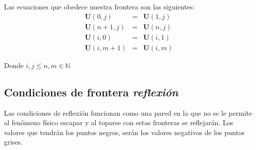 \documentclass[12pt,a4paper]{book}
\begin{document}
Las ecuaciones que obedece nuestra frontera son las siguientes:
\begin{eqnarray}
\textbf{U}(0,j)&=&\textbf{U}(1,j) \\
\textbf{U}(n+1,j)&=&\textbf{U}(n,j) \\
\textbf{U}(i,0)&=&\textbf{U}(i,1) \\
\textbf{U}(i,m+1)&=&\textbf{U}(i,m) 
\end{eqnarray}

Donde $i,j \leq n,m \in \mathbb{N}$

\subsection{Condiciones de frontera \emph{reflexión}}

Las condiciones de reflexión funcionan como una pared en la que no se le permite al fenómeno físico escapar y al toparse con estas fronteras se reflejarán. Los valores que tendrán los puntos negros, serán los valores negativos de los puntos grises.
\end{document}
